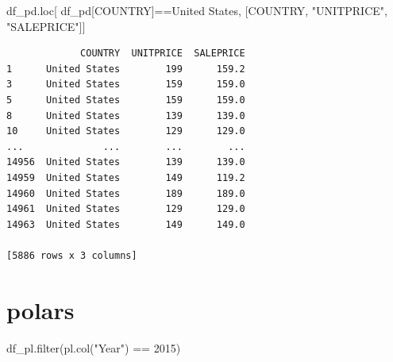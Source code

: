 \documentclass[
  letterpaper,
  DIV=11,
  numbers=noendperiod]{scrreprt}
\newenvironment{Shaded}{\begin{snugshade}}{\end{snugshade}}
\newcommand{\BuiltInTok}[1]{\textcolor[rgb]{0.00,0.23,0.31}{#1}}
\newcommand{\DecValTok}[1]{\textcolor[rgb]{0.68,0.00,0.00}{#1}}
\newcommand{\NormalTok}[1]{\textcolor[rgb]{0.00,0.23,0.31}{#1}}
\newcommand{\OperatorTok}[1]{\textcolor[rgb]{0.37,0.37,0.37}{#1}}
\newcommand{\StringTok}[1]{\textcolor[rgb]{0.13,0.47,0.30}{#1}}
\begin{document}
\begin{Shaded}
\begin{Highlighting}[]
\NormalTok{df\_pd.loc[}
\NormalTok{    df\_pd[}\StringTok{\textquotesingle{}COUNTRY\textquotesingle{}}\NormalTok{]}\OperatorTok{==}\StringTok{\textquotesingle{}United States\textquotesingle{}}\NormalTok{,}
\NormalTok{    [}\StringTok{\textquotesingle{}COUNTRY\textquotesingle{}}\NormalTok{, }\StringTok{"UNITPRICE"}\NormalTok{, }\StringTok{"SALEPRICE"}\NormalTok{]]}
\end{Highlighting}
\end{Shaded}

\begin{verbatim}
             COUNTRY  UNITPRICE  SALEPRICE
1      United States        199      159.2
3      United States        159      159.0
5      United States        159      159.0
8      United States        139      139.0
10     United States        129      129.0
...              ...        ...        ...
14956  United States        139      139.0
14959  United States        149      119.2
14960  United States        189      189.0
14961  United States        129      129.0
14963  United States        149      149.0

[5886 rows x 3 columns]
\end{verbatim}

\section{polars}

\begin{Shaded}
\begin{Highlighting}[]
\NormalTok{df\_pl.}\BuiltInTok{filter}\NormalTok{(pl.col(}\StringTok{"Year"}\NormalTok{) }\OperatorTok{==} \DecValTok{2015}\NormalTok{)}
\end{Highlighting}
\end{Shaded}
\end{document}
